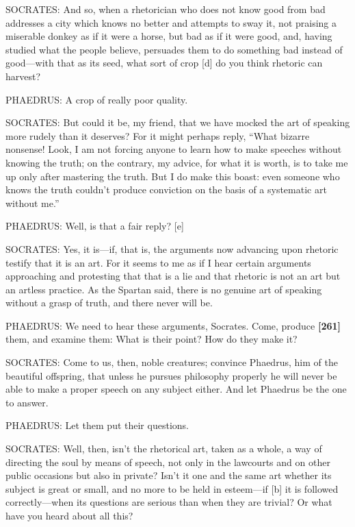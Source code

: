 SOCRATES: And so, when a rhetorician who does not know good from bad
addresses a city which knows no better and attempts to sway it, not
praising a miserable donkey as if it were a horse, but bad as if it were
good, and, having studied what the people believe, persuades them to do
something bad instead of good---with that as its seed, what sort of crop
{[}d{]} do you think rhetoric can harvest?

PHAEDRUS: A crop of really poor quality.

SOCRATES: But could it be, my friend, that we have mocked the art of
speaking more rudely than it deserves? For it might perhaps reply, “What
bizarre nonsense! Look, I am not forcing anyone to learn how to make
speeches without knowing the truth; on the contrary, my advice, for what
it is worth, is to take me up only after mastering the truth. But I do
make this boast: even someone who knows the truth couldn't produce
conviction on the basis of a systematic art without me.”

PHAEDRUS: Well, is that a fair reply? {[}e{]}

SOCRATES: Yes, it is---if, that is, the arguments now advancing upon
rhetoric testify that it is an art. For it seems to me as if I hear
certain arguments approaching and protesting that that is a lie and that
rhetoric is not an art but an artless
practice. As the
Spartan said, there is no genuine art of speaking without a grasp of
truth, and there never will be.

PHAEDRUS: We need to hear these arguments, Socrates. Come, produce
{\bf {[}261{]}} them, and examine them: What is their point? How do they
make it?

SOCRATES: Come to us, then, noble creatures; convince Phaedrus, him of
the beautiful
offspring, that unless
he pursues philosophy properly he will never be able to make a proper
speech on any subject either. And let Phaedrus be the one to answer.

PHAEDRUS: Let them put their questions.

SOCRATES: Well, then, isn't the rhetorical art, taken as a whole, a way
of directing the soul by means of speech, not only in the lawcourts and
on other public occasions but also in private? Isn't it one and the same
art whether its subject is great or small, and no more to be held in
esteem---if {[}b{]} it is followed correctly---when its questions are
serious than when they are trivial? Or what have you heard about all
this?

